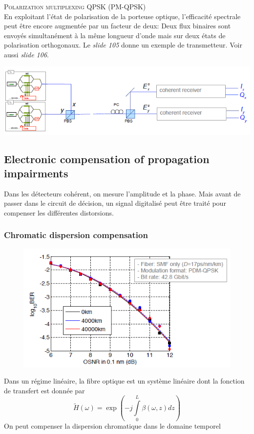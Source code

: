 \textsc{Polarization multiplexing QPSK (PM-QPSK)}\\
En exploitant l'état de polarisation de la porteuse optique, l'efficacité spectrale peut être encore augmentée par un facteur de deux: Deux flux binaires sont envoyés simultanément à la même longueur d'onde mais sur deux états de polarisation orthogonaux. Le \textit{slide 105} donne un exemple
de transmetteur. Voir aussi \textit{slide 106}.
\begin{center}
	\includegraphics[scale=0.65]{ch6/image46}
\end{center}



\subsection{Electronic compensation of propagation impairments}
Dans les détecteurs cohérent, on mesure l'amplitude et la phase. Mais avant de passer dans le
circuit de décision, un signal digitalisé peut être traité pour compenser les différentes 
distorsions. 

\subsubsection{Chromatic dispersion compensation}
\begin{figure}
	\vspace{-5mm}
	\includegraphics[scale=0.45]{ch6/image47}
	\end{figure}
Dans un régime linéaire, la fibre optique est un système linéaire dont la fonction de 
transfert est donnée par
\begin{equation}
\tilde H(\omega ) = \exp ( - j\int\limits_0^L {\beta (\omega ,z)dz} )
\end{equation}
On peut compenser la dispersion chromatique dans le domaine temporel\\
\\

